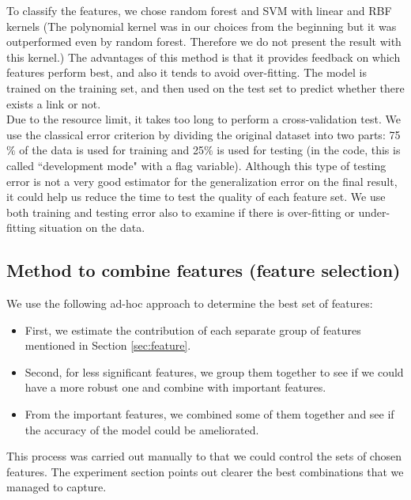\documentclass{article}
\begin{document}
To classify the features, we chose random forest and SVM with linear and RBF kernels (The polynomial kernel was in our choices from the beginning but it was outperformed even by random forest. Therefore we do not present the result with this kernel.) The advantages of this method is that it provides feedback on which features perform best, and also it tends to avoid over-fitting. The model is trained on the training set, and then used on the test set to predict whether there exists a link or not.\\
Due to the resource limit, it takes too long to perform a cross-validation test. We use the classical error criterion by dividing the original dataset into two parts: 75$\%$ of the data is used for training and 25$\%$ is used for testing (in the code, this is called ``development mode" with a flag variable). Although this type of testing error is not a very good estimator for the generalization error on the final result, it could help us reduce the time to test the quality of each feature set. We use both training and testing error also to examine if there is over-fitting or under-fitting situation on the data.

\subsection{Method to combine features (feature selection)}

We use the following ad-hoc approach to determine the best set of features:
\begin{itemize}
\item First, we estimate the contribution of each separate group of features mentioned in Section \ref{sec:feature}.
\item Second, for less significant features, we group them together to see if we could have a more robust one and combine with important features.
\item From the important features, we combined some of them together and see if the accuracy of the model could be ameliorated.
\end{itemize}
This process was carried out manually to that we could control the sets of chosen features. The experiment section points out clearer the best combinations that we managed to capture.
\end{document}
